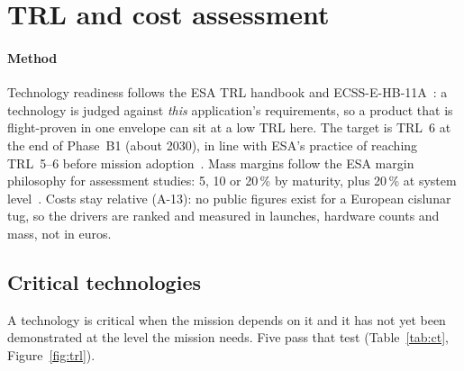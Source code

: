 \documentclass[11pt,a4paper]{article}
\newcommand{\id}[1]{#1}
\begin{document}
\section{TRL and cost assessment}\label{sec:trl}

\paragraph{Method} Technology readiness follows the ESA TRL handbook and ECSS-E-HB-11A~\cite{trlhandbook,ecsstrl}: a technology is judged against \emph{this} application's requirements, so a product that is flight-proven in one envelope can sit at a low TRL here. The target is TRL~6 at the end of Phase~B1 (about 2030), in line with ESA's practice of reaching TRL~5--6 before mission adoption~\cite{esatrl56}. Mass margins follow the ESA margin philosophy for assessment studies: 5, 10 or 20\,\% by maturity, plus 20\,\% at system level~\cite{esamargins}. Costs stay relative (\id{A-13}): no public figures exist for a European cislunar tug, so the drivers are ranked and measured in launches, hardware counts and mass, not in euros.

\newpage
\subsection{Critical technologies}

A technology is critical when the mission depends on it and it has not yet been demonstrated at the level the mission needs. Five pass that test (Table~\ref{tab:ct}, Figure~\ref{fig:trl}).
\end{document}
